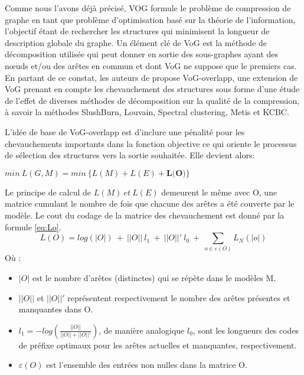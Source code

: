 			Comme nous l'avons déjà précisé, VOG formule le problème de compression de graphe en tant que problème d'optimisation basé sur la théorie de l'information, l'objectif étant de rechercher les structures  qui minimisent la longueur de description globale du graphe. Un élément clé de VoG est la méthode de décomposition utilisée qui peut donner en sortie des sous-graphes ayant des nœuds et/ou des arêtes en commun et dont VoG\citep{koutra2015summarizing} ne suppose que le premiers cas. 
			En partant de ce constat, les auteurs de \citep{liu2015empirical} propose VoG-overlapp, une extension de VoG prenant en compte les chevauchement des structures sous forme d'une étude de l'effet de diverses méthodes de décomposition sur la qualité de la compression, à savoir la méthodes SlushBurn, Louvain, Spectral clustering, Metis et KCBC.
			
			L'idée de base de VoG-overlapp est d'inclure une pénalité pour les chevauchements importants dans la fonction objective ce qui oriente le processus de sélection des structures vers la sortie souhaitée. Elle devient alors:
			\begin{center}
				$min\ L(G,M) = min\ \big\{L(M) + L(E) +\textbf{L(O)}\big\}$
			\end{center}
			
			Le principe de calcul de $L(M)\ et\ L(E)$ demeurent le même avec O, une matrice cumulant le nombre de fois que chacune des arêtes a été couverte par le modèle. Le cout du codage de la matrice des chevauchement est donné par la formule \eqref{eq:Lo}.
			\begin{equation} \label{eq:Lo}
				L(O) = log(|O|)\ +\ ||O||\ l_{1}\ +\ ||O||'\ l_{0}\ +\  \displaystyle{\sum_{o\in\varepsilon(O)}L_{N}(|o|)}
			\end{equation}
			Où :
			\begin{itemize}[label=$\circ$]
				\item $|O|$  est le nombre d'arêtes (distinctes) qui se répète dans le modèles M. 
				\item $||O||$ et $||O||'$ représentent respectivement le nombre des arêtes présentes et manquantes dans O.
				\item $l_{1} = -log (\frac{||O||}{||O||+||O||'})$, de manière analogique $l_{0}$, sont les longueurs des codes de préfixe optimaux pour les arêtes actuelles et manquantes, respectivement.
				\item $\varepsilon(O)$  est l'ensemble des entrées non nulles dans la matrice O.
			\end{itemize}